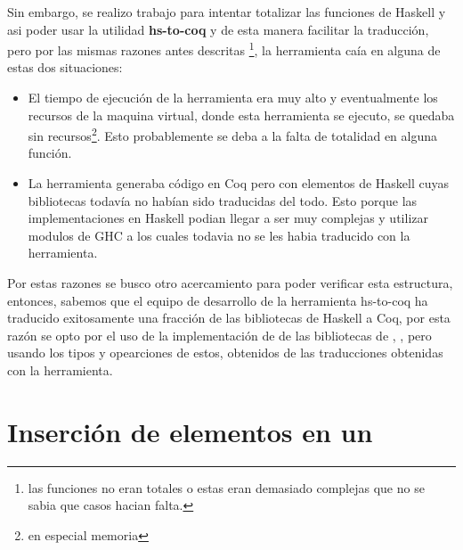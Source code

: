  Sin embargo, se realizo trabajo para intentar totalizar las funciones de Haskell y asi poder usar
 la utilidad \textbf{hs-to-coq} y de esta manera facilitar la traducci\'on, pero por las mismas
 razones antes descritas \footnote{las funciones no eran totales o estas eran demasiado complejas
 que no se sabia que casos hacian falta.}, la herramienta caía en alguna de estas dos situaciones:

\begin{itemize}
    \item El tiempo de ejecuci\'on de la herramienta era muy alto y eventualmente los recursos de
    la maquina virtual, donde esta herramienta se ejecuto, se quedaba sin recursos\footnote{en
    especial memoria}. Esto probablemente se deba a la falta de totalidad en alguna función.
    \item La herramienta generaba c\'odigo en Coq pero con elementos de Haskell cuyas bibliotecas
    todavía no habían sido traducidas del todo. Esto porque las implementaciones en Haskell podian
    llegar a ser muy complejas y utilizar modulos de GHC a los cuales todavia no se les habia
    traducido con la herramienta.
\end{itemize}{}

Por estas razones se busco otro acercamiento para poder verificar esta estructura, entonces,
sabemos que el equipo de desarrollo de la herramienta hs-to-coq ha traducido exitosamente una
fracci\'on de las bibliotecas de Haskell a Coq, por esta raz\'on se opto por el uso de la
implementación de {\arns} de las bibliotecas de {\coq}, \cite{MSetRBT}, pero usando los tipos y
opearciones de estos, obtenidos de las traducciones obtenidas con la herramienta.

\section{Inserción de elementos en un {\arn}}

